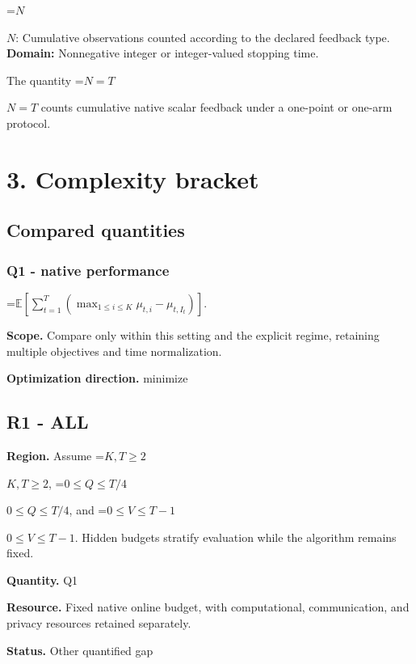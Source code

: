 \documentclass[10pt,a4paper]{article}
\newcommand{\AtlasMath}[1]{\par\begingroup\centering\setbox0=\hbox{$\displaystyle #1$}\ifdim\wd0>1.4\linewidth\typeout{ATLAS WIDE FORMULA: \the\wd0}\fi\ifdim\wd0>\linewidth\resizebox{\linewidth}{!}{\box0}\else\box0\fi\par\endgroup}
\newcommand{\AtlasInlineMath}[1]{\begingroup\setbox0=\hbox{$#1$}\ifdim\wd0>.4\linewidth\endgroup\AtlasMath{#1}\else\endgroup$#1$\fi}
\begin{document}
\AtlasInlineMath{N}: Cumulative observations counted according to the declared feedback type. \textbf{Domain:} Nonnegative integer or integer-valued stopping time.



The quantity \AtlasInlineMath{N=T} counts cumulative native scalar feedback under a one-point or one-arm protocol.



\section{3. Complexity bracket}


\subsection{Compared quantities}


\subsubsection{Q1 - native performance}


\AtlasMath{\mathbb E\!\left[\sum_{t=1}^{T}\left(\max_{1\le i\le K}\mu_{t,i}-\mu_{t,I_t}\right)\right].}


\textbf{Scope.} Compare only within this setting and the explicit regime, retaining multiple objectives and time normalization.



\textbf{Optimization direction.} minimize



\subsection{R1 - ALL}


\textbf{Region.} Assume \AtlasInlineMath{K,T\ge2}, \AtlasInlineMath{0\le Q\le T/4}, and \AtlasInlineMath{0\le V\le T-1}. Hidden budgets stratify evaluation while the algorithm remains fixed.



\textbf{Quantity.} Q1



\textbf{Resource.} Fixed native online budget, with computational, communication, and privacy resources retained separately.



\textbf{Status.} Other quantified gap
\end{document}
